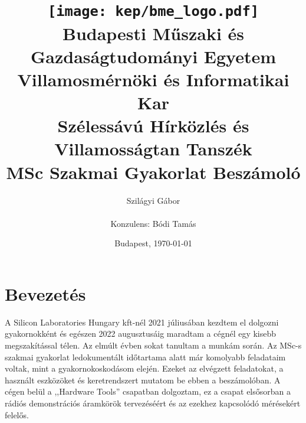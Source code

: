 \documentclass[a4paper,12pt,titlepage]{article}
\title{
\centering
\texttt{[image: kep/bme\_logo.pdf]} \\
\vspace{0.5cm}
\large{\textbf{Budapesti Műszaki és Gazdaságtudományi Egyetem}\\
\textbf{Villamosmérnöki és Informatikai Kar}\\
\textbf{Szélessávú Hírközlés és Villamosságtan Tanszék}}\\
\vspace{5cm}
\huge{\textbf{MSc Szakmai Gyakorlat Beszámoló}} \\
\vspace{3cm}}
\author{Szilágyi Gábor \\\vspace{2cm}\\ Konzulens: Bódi Tamás}
\date{Budapest, \today}
\begin{document}
    \maketitle
    \section{Bevezetés}
    A Silicon Laboratories Hungary kft-nél 2021 júliusában kezdtem el dolgozni gyakornokként és egészen 2022 augusztusáig maradtam a cégnél egy kisebb megszakítással télen. Az elmúlt évben sokat tanultam a munkám során. Az MSc-s szakmai gyakorlat ledokumentált időtartama alatt már komolyabb feladataim voltak, mint a gyakornokoskodásom elején. Ezeket az elvégzett feladatokat, a használt eszközöket és keretrendszert mutatom be ebben a beszámolóban. A cégen belül a ,,Hardware Tools'' csapatban dolgoztam, ez a csapat elsősorban a rádiós demonstrációs áramkörök tervezéséért és az ezekhez kapcsolódó mérésekért felelős.
\end{document}
